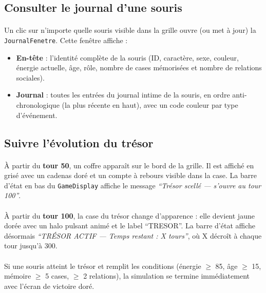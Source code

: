 \bigskip

\subsection{Consulter le journal d'une souris}

\paragraph{} Un clic sur n'importe quelle souris visible dans la grille ouvre (ou met à jour) la \texttt{JournalFenetre}. Cette fenêtre affiche :

\begin{itemize}
    \item \textbf{En-tête} : l'identité complète de la souris (ID, caractère, sexe, couleur, énergie actuelle, âge, rôle, nombre de cases mémorisées et nombre de relations sociales).
    \item \textbf{Journal} : toutes les entrées du journal intime de la souris, en ordre anti-chronologique (la plus récente en haut), avec un code couleur par type d'événement.
\end{itemize}


\bigskip

\subsection{Suivre l'évolution du trésor}

\paragraph{} À partir du \textbf{tour 50}, un coffre apparaît sur le bord de la grille. Il est affiché en grisé avec un cadenas doré et un compte à rebours visible dans la case. La barre d'état en bas du \texttt{GameDisplay} affiche le message \textit{``Trésor scellé — s'ouvre au tour 100''}.

\paragraph{} À partir du \textbf{tour 100}, la case du trésor change d'apparence : elle devient jaune dorée avec un halo pulsant animé et le label ``TRESOR''. La barre d'état affiche désormais \textit{``TRÉSOR ACTIF --- Temps restant : X tours''}, où X décroît à chaque tour jusqu'à 300.

\paragraph{} Si une souris atteint le trésor et remplit les conditions (énergie $\geq$ 85, âge $\geq$ 15, mémoire $\geq$ 5 cases, $\geq$ 2 relations), la simulation se termine immédiatement avec l'écran de victoire doré.


